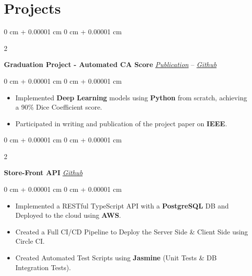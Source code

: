 \documentclass[10pt, letterpaper]{article}
\newenvironment{highlights}{
    \begin{itemize}[
        topsep=0.10 cm,
        parsep=0.10 cm,
        partopsep=0pt,
        itemsep=0pt,
        leftmargin=0 cm + 10pt
    ]
}{
    \end{itemize}
} %
\newenvironment{onecolentry}{
    \begin{adjustwidth}{
        0 cm + 0.00001 cm
    }{
        0 cm + 0.00001 cm
    }
}{
    \end{adjustwidth}
} %
\newenvironment{twocolentry}[2][]{
    \onecolentry
    \def\secondColumn{#2}
    \setcolumnwidth{\fill, 4.5 cm}
    \begin{paracol}{2}
}{
    \switchcolumn \raggedleft \secondColumn
    \end{paracol}
    \endonecolentry
} %
\begin{document}
    
    \section{Projects}
        \begin{twocolentry}{
            \href{https://ieeexplore.ieee.org/document/10510468}{\textit{Publication}} -- \href{https://github.com/Automated-CAD-Scoring-Suite/Automatic-CaScoring-From-Chest-CT}{\textit{Github}}
        }
            \textbf{Graduation Project - Automated CA Score }\end{twocolentry}

        \vspace{0.10 cm}
        \begin{onecolentry}
            \begin{highlights}
                \item Implemented \textbf{Deep Learning} models using \textbf{Python} from scratch, achieving a 90\% Dice Coefficient score.
                \item Participated in writing and publication of the project paper on \textbf{IEEE}. 
            \end{highlights}
        \end{onecolentry}


        \vspace{0.2 cm}

        \begin{twocolentry}{
            \href{https://github.com/Ahmad-Abdalmageed/Store-API}{\textit{Github}}
        }
            \textbf{Store-Front API}\end{twocolentry}

        \vspace{0.10 cm}
        \begin{onecolentry}
            \begin{highlights}
                \item Implemented a RESTful TypeScript API with a \textbf{PostgreSQL} DB and Deployed to the cloud using \textbf{AWS}.
                \item Created a Full CI/CD Pipeline to Deploy the Server Side \& Client Side using Circle CI.
                \item Created Automated Test Scripts using \textbf{Jasmine} (Unit Tests \& DB Integration Tests).
            \end{highlights}
        \end{onecolentry}


        \vspace{0.1 cm}
\end{document}
